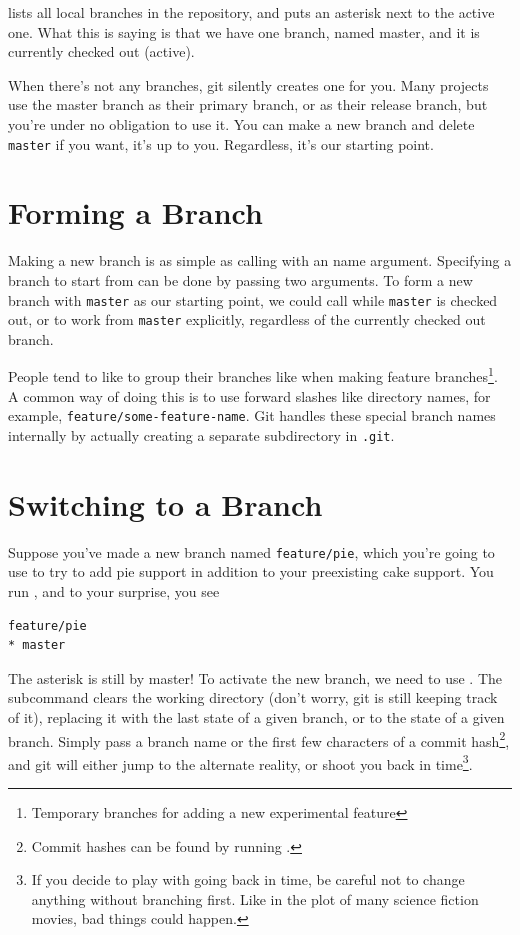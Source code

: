 \documentclass[11pt,letterpaper,twoside]{report}
\begin{document}
 lists all local branches in the repository, and puts an
asterisk next to the active one. What this is saying is that we have one branch,
named master, and it is currently checked out (active).

When there's not any branches, git silently creates one for you. Many projects
use the master branch as their primary branch, or as their release branch, but
you're under no obligation to use it. You can make a new branch and delete
\texttt{master} if you want, it's up to you. Regardless, it's our starting
point.

\section{Forming a Branch}

Making a new branch is as simple as calling  with an name
argument. Specifying a branch to start from can be done by passing two
arguments. To form a new branch with \texttt{master} as our starting point, we
could call  while \texttt{master} is checked
out, or  to work from \texttt{master}
explicitly, regardless of the currently checked out branch.

People tend to like to group their branches like when making feature
branches\footnote{Temporary branches for adding a new experimental feature}. A
common way of doing this is to use forward slashes like directory names, for
example, \texttt{feature/some-feature-name}. Git handles these special branch
names internally by actually creating a separate subdirectory in \texttt{.git}.

\section{Switching to a Branch}

Suppose you've made a new branch named \texttt{feature/pie}, which you're going
to use to try to add pie support in addition to your preexisting cake support.
You run , and to your surprise, you see

\begin{lstlisting}[numbers=none]
  feature/pie
* master
\end{lstlisting}

The asterisk is still by master! To activate the new branch, we need to use
. The subcommand clears the working directory (don't worry,
git is still keeping track of it), replacing it with the last state of a given
branch, or to the state of a given branch. Simply pass  a
branch name or the first few characters of a commit hash\footnote{Commit hashes
can be found by running .}, and git will either jump to the
alternate reality, or shoot you back in time\footnote{If you decide to play with
going back in time, be careful not to change anything without branching first.
Like in the plot of many science fiction movies, bad things could happen.}.
\end{document}
